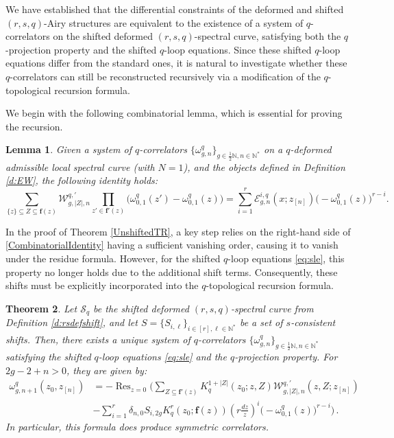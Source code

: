 \documentclass[reqno,11pt]{amsart}
\theoremstyle{plain}
\newtheorem{theorem}{Theorem}[section]
\newtheorem{lemma}[theorem]{Lemma}
\theoremstyle{definition}
\theoremstyle{remark}
\numberwithin{equation}{section}
\newcommand{\mb}[1]{\mathbb{#1}}
\newcommand{\1}{\mathds{1}}
\newcommand{\N}{\mb{N}}
\newcommand{\2}{\frac{1}{2}}
\DeclareMathOperator*{\Res}{Res}
\begin{document}
{								
								We have established that the differential constraints of the deformed and shifted $(r,s,q)$-Airy structures are equivalent to the existence of a system of $q$-correlators on the shifted deformed $(r,s,q)$-spectral curve,  satisfying both the $q$-projection property and the shifted $q$-loop equations. 
								Since these shifted $q$-loop equations differ from the standard ones, it is natural  to investigate whether these $q$-correlators can still be reconstructed recursively via a modification of the $q$-topological recursion formula.
								
								We begin with the following combinatorial lemma, which is essential for proving the recursion.
								
								\begin{lemma}
									Given a system of $q$-correlators $ \{ \omega^{q}_{g,n} \}_{g \in \frac{1}{2} \N, n\in \N^*}$ on a $q$-deformed  admissible local spectral curve (with $N=1$), and  the objects defined in Definition \ref{d:EW}, the following identity holds: 
									\begin{equation}\label{CombinatorialIdentity}
										\sum_{ \{ z\} \subseteq Z \subseteq \mathbf{f}(z)} \! \mathcal{W}^{q,'}_{g,|Z|,n} \!\! \prod_{z' \in \mathbf{f}'(z) } \!\! \Big( \omega^{q}_{0,1} (z') - \omega^{q}_{0,1} (z) \Big)
										=
										\sum_{i=1}^r \mathcal{E}^{i,q}_{g,n}(x; z_{[n]}) \big( - \omega^{q}_{0,1}(z)\big)^{r-i}.
									\end{equation}
								\end{lemma}
								
								In the proof of Theorem \ref{UnshiftedTR}, a key step relies on the right-hand side of \eqref{CombinatorialIdentity} having a sufficient vanishing order, causing it to vanish under the residue formula. However, for the shifted $q$-loop equations \eqref{eq:sle}, this property no longer holds due to the additional shift terms. Consequently, these shifts must be explicitly incorporated into the $q$-topological recursion formula.
								\begin{theorem}\label{ShiftedTR}
									Let $\mathcal{S}_q$ be the shifted deformed $(r,s,q)$-spectral curve from Definition \ref{d:rsdefshift}, and  let $S = \{S_{i,\ell} \}_{i \in [r], \ell \in \mathbb{N}^*}$ be a set of $s$-consistent shifts. Then, there exists a unique system of $q$-correlators $\{\omega^{q}_{g,n} \}_{g \in \frac{1}{2}\mathbb{N}, n \in \mathbb{N}^*}$ satisfying the shifted $q$-loop equations \eqref{eq:sle} and the $q$-projection property.  For $2g-2+n > 0$, they are given by:
									\begin{align}
										\omega^{q}_{g,n+1}(z_0, z_{[n]}) 
										&= 
										-\Res_{z = 0} \Big( \sum_{Z \subseteq \mathbf{f}' (z)}
										K^{1 + |Z|}_q(z_0; z, Z) \mathcal{W}^{q,'}_{g,|Z|,n} (z,Z; z_{[n]})\nonumber
										\\
										&
										- \sum_{i=1}^{r}\delta_{n,0} S_{i,2g} K^r_q(z_0; \mathbf{f}(z)) \left( r\frac{dz}{z} \right)^{i} \big( - \omega^{q}_{0,1}(z)\big)^{r-i}\Big)\,.
									\end{align}
									In particular, this formula does produce symmetric correlators.
								\end{theorem}
								
}
\end{document}
